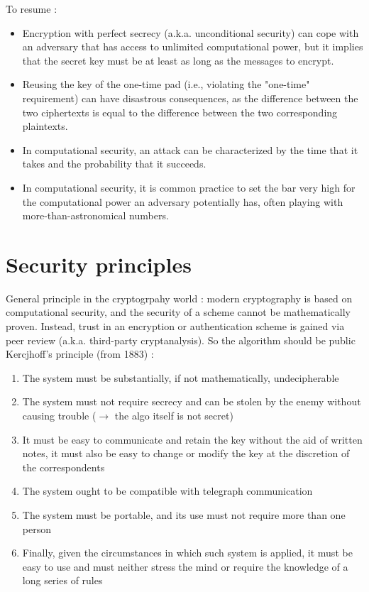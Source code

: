 \documentclass[11pt,a4paper]{report}
\begin{document}
To resume :
\begin{itemize}
\vspace{-2mm}
\item Encryption with perfect secrecy (a.k.a. unconditional security) can cope with an adversary that has access to unlimited computational power, but it implies that the secret key must be at least as long as the messages to encrypt.
\item Reusing the key of the one-time pad (i.e., violating the "one-time" requirement) can have disastrous consequences, as the difference between the two ciphertexts is equal to the difference between the two corresponding plaintexts.
\item In computational security, an attack can be characterized by the time that it takes and the probability that it succeeds.
\item In computational security, it is common practice to set the bar very high for the computational power an adversary potentially has, often playing with more-than-astronomical numbers.
\end{itemize} 

\section{Security principles}
General principle in the cryptogrpahy world : modern cryptography is based on computational security, and the security of a scheme cannot be mathematically proven. Instead, trust in an encryption or authentication scheme is gained via peer review (a.k.a. third-party cryptanalysis). So the algorithm should be public\\

Kercjhoff's principle (from 1883) :
\begin{enumerate}
\item The system must be substantially, if not mathematically, undecipherable
\item The system must not require secrecy and can be stolen by the enemy without causing trouble ($\rightarrow$ the algo itself is not secret)
\item It must be easy to communicate and retain the key without the aid of written notes, it must also be easy to change or modify the key at the discretion of the correspondents
\item The system ought to be compatible with telegraph communication
\item The system must be portable, and its use must not require more than
one person
\item Finally, given the circumstances in which such system is applied, it must be easy to use and must neither stress the mind or require the knowledge of a long series of rules
\end{enumerate}
\end{document}
